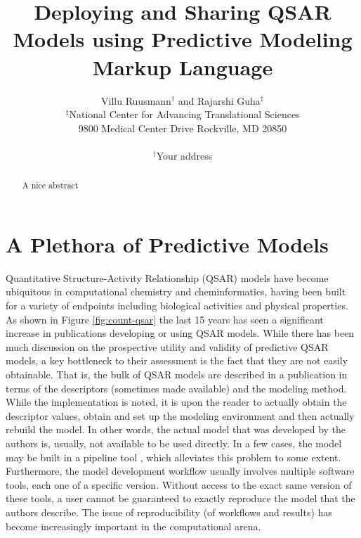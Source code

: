 \documentclass[12pt,letterpaper]{article}
\begin{document}
\title{Deploying and Sharing QSAR Models using Predictive Modeling Markup Language}
\author{Villu Ruusmann${}^{\dagger}$ and Rajarshi Guha${}^{\ddagger}$\\
${}^{\ddagger}$National Center for Advancing Translational Sciences\\ 9800 Medical Center Drive  Rockville, MD 20850 \\ \\
${}^{\dagger}$Your address }
\date{}
\maketitle
\begin{abstract}
  A nice abstract
\end{abstract}

\section{A Plethora of Predictive Models}
\label{sec:introduction}

Quantitative Structure-Activity Relationship (QSAR) models have become
ubiquitous in computational chemistry and cheminformatics, having been
built for a variety of endpoints including biological activities and
physical properties. As shown in Figure \ref{fig:count-qsar} the last
15 years has seen a significant increase in publications developing or
using QSAR models. While there has been much discussion
\cite{Cherkasov:2014yq,Cramer2011Inevitable,Tropsha:2003aa} on the
prospective utility and validity of predictive QSAR models, a key
bottleneck to their assessment is the fact that they are not easily
obtainable. That is, the bulk of QSAR models are described in a
publication in terms of the descriptors (sometimes made available) and
the modeling method. While the implementation is noted, it is upon the
reader to actually obtain the descriptor values, obtain and set up the
modeling environment and then actually rebuild the model. In other
words, the actual model that was developed by the authors is, usually,
not available to be used directly. In a few cases, the model may be
built in a pipeline tool \cite{KNIME:2008aa}, which alleviates this
problem to some extent. Furthermore, the model development workflow
usually involves multiple software tools, each one of a specific
version. Without access to the exact same version of these tools, a
user cannot be guaranteed to exactly reproduce the model that the
authors describe. The issue of reproducibility (of workflows and
results) has become increasingly important \cite{Landrum:2012hl,
  Stodden:2013gd,Lane:2003fe} in the computational arena.
\end{document}
